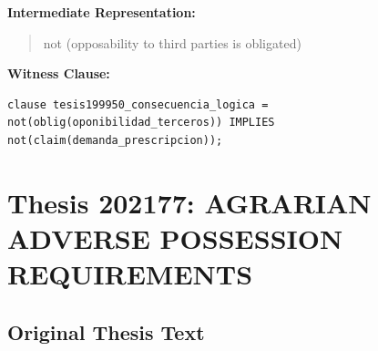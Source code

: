\documentclass[11pt,a4paper]{article}
\begin{document}
\textbf{Intermediate Representation:}

\begin{quote}
not (opposability to third parties is obligated)
\end{quote}

\textbf{Witness Clause:}

\begin{lstlisting}[style=witnessstyle, language=Witness]
clause tesis199950_consecuencia_logica = not(oblig(oponibilidad_terceros)) IMPLIES not(claim(demanda_prescripcion));
\end{lstlisting}

\newpage

\section{Thesis 202177: AGRARIAN ADVERSE POSSESSION REQUIREMENTS}
\label{thesis:202177}

\subsection{Original Thesis Text}
\end{document}
